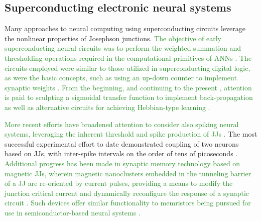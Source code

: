 \documentclass[twocolumn]{article}
\begin{document}
\subsection{Superconducting electronic neural systems}
Many approaches to neural computing using superconducting circuits leverage the nonlinear properties of Josephson junctions. \textcolor{ForestGreen}{The objective of early superconducting neural circuits was to perform the weighted summation and thresholding operations required in the computational primitives of ANNs \cite{hago1991,hiak1991}. The circuits employed were similar to those utilized in superconducting digital logic, as were the basic concepts, such as using an up-down counter to implement synaptic weights \cite{hiak1991}. From the beginning, and continuing to the present \cite{sckl2016,klsc2018,sosc2018}, attention is paid to sculpting a sigmoidal transfer function to implement back-propagation as well as alternative circuits for achieving Hebbian-type learning \cite{hago1991}.} 

\textcolor{ForestGreen}{More recent efforts have broadened attention to consider also spiking neural systems, leveraging the inherent threshold and spike production of JJs \cite{crsc2010,scdo2018}.}  The most successful experimental effort to date demonstrated coupling of two neurons based on JJs, with inter-spike intervals on the order of tens of picoseconds \cite{sele2017}. \textcolor{ForestGreen}{Additional progress has been made in synaptic memory technology based on magnetic JJs, wherein magnetic nanoclusters embedded in the tunneling barrier of a JJ are re-oriented by current pulses, providing a means to modify the junction critical current and dynamically reconfigure the response of a synaptic circuit \cite{scdo2018}. Such devices offer similar functionality to memristors being pursued for use in semiconductor-based neural systems \cite{kiha2018}.} 
\end{document}
